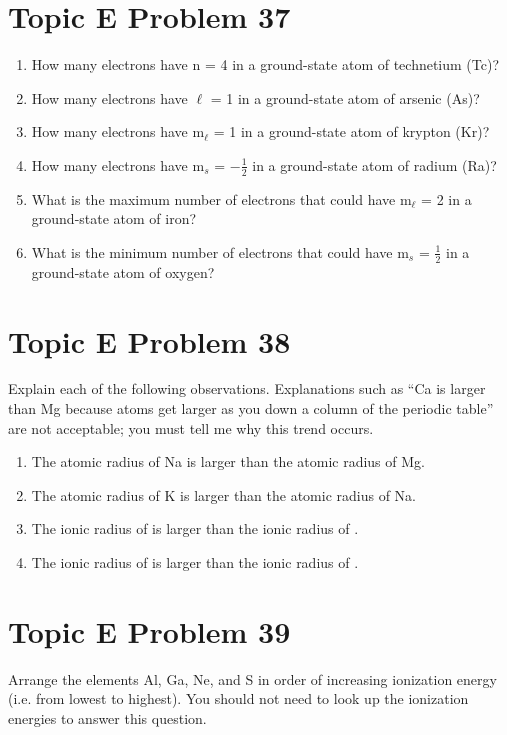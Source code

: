 \documentclass[10pt]{article}
\begin{document}
    \section{Topic E Problem 37}
        \begin{enumerate}[label=\alph*)]
            \item   How many electrons have n = 4 in a ground-state atom of technetium (Tc)?
            \item   How many electrons have $\ell$ = 1 in a ground-state atom of arsenic (As)?
            \item   How many electrons have m$_\ell$ = 1 in a ground-state atom of krypton (Kr)?
            \item   How many electrons have m$_s$ = $-\frac{1}{2}$ in a ground-state atom of radium (Ra)?
            \item   What is the maximum number of electrons that could have m$_\ell$ = 2 in a ground-state atom of iron?
            \item   What is the minimum number of electrons that could have m$_s$ = $\frac{1}{2}$ in a ground-state atom of oxygen?
        \end{enumerate}


    \pagebreak
    \section{Topic E Problem 38}
        Explain each of the following observations. 
        Explanations such as “Ca is larger than Mg because atoms get larger as you down a column of the periodic table” are not acceptable; you must tell me why this trend occurs.
        \begin{enumerate}[label=\alph*)]
            \item   The atomic radius of Na is larger than the atomic radius of Mg.
            \item   The atomic radius of K is larger than the atomic radius of Na.
            \item   The ionic radius of  is larger than the ionic radius of .
            \item   The ionic radius of  is larger than the ionic radius of .
        \end{enumerate}
        

    \pagebreak
    \section{Topic E Problem 39}
        Arrange the elements Al, Ga, Ne, and S in order of increasing ionization energy (i.e. from lowest to highest). 
        You should not need to look up the ionization energies to answer this question.
\end{document}
